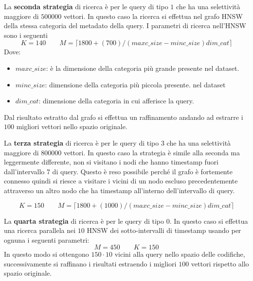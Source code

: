 La \textbf{seconda strategia} di ricerca è per le query di tipo $1$ che ha una selettività 
maggiore di $500000$ vettori. In questo caso la ricerca si effettua nel grafo 
HNSW della stessa categoria del metadato della query. I parametri di ricerca nell'HNSW
sono i seguenti 
$$K = 140 \qquad M= \lceil1800+(700)/(maxc\_size - minc\_size)dim\_cat\rceil$$
Dove:
\begin{itemize}
    \item $maxc\_size$: è la dimensione della categoria più grande presente 
    nel dataset.
    \item $minc\_size$: dimensione della categoria più piccola presente.
    nel dataset
    \item $dim\_cat$: dimensione della categoria in cui afferisce la query.
\end{itemize}
Dal risultato estratto dal grafo si effettua un raffinamento andando ad estrarre 
i $100$ migliori vettori nello spazio originale.

La \textbf{terza strategia} di ricerca è per le query di tipo $3$ che ha una selettività 
maggiore di $800000$ vettori. In questo caso la strategia è simile alla seconda 
ma leggermente differente, non si visitano i nodi che hanno timestamp fuori dall'intervallo 7
di query. Questo è reso possibile perché il grafo è fortemente connesso quindi 
si riesce a visitare i vicini di un nodo escluso precedentemente attraverso un altro 
nodo che ha timestamp all'interno dell'intervallo di query.

$$K = 150 \qquad M= \lceil1800+(1000)/(maxc\_size - minc\_size)dim\_cat\rceil$$

La \textbf{quarta strategia} di ricerca è per le query di tipo $0$. In questo caso 
si effettua una ricerca parallela nei $10$ HNSW dei sotto-intervalli di timestamp 
usando per ognuna i seguenti parametri:
$$M=450 \qquad K=150$$
In questo modo si ottengono $150\cdot 10$ vicini alla query nello spazio delle 
codifiche, successivamente si raffinano i risultati estraendo i migliori $100$ 
vettori rispetto allo spazio originale.

